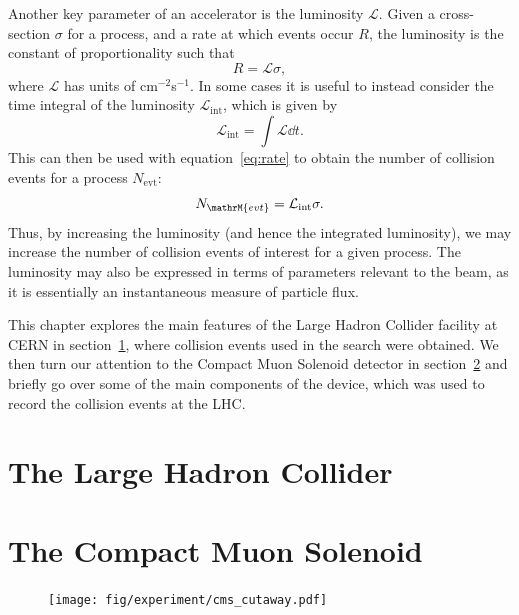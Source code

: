 Another key parameter of an accelerator is the luminosity $\mathcal{L}$.
Given a cross-section $\sigma$ for a process, and a rate at which events occur $R$, the luminosity is the constant of proportionality such that
\begin{equation}\label{eq:rate}
  R=\mathcal{L}\sigma,
\end{equation}
where $\mathcal{L}$ has units of cm$^{-2}$s$^{-1}$. %
In some cases it is useful to instead consider the time integral of the luminosity $\mathcal{L}_\mathrm{int}$, which is given by
\begin{equation}
  \mathcal{L}_\mathrm{int}=\int\mathcal{L}\dd{t}.
\end{equation}
This can then be used with equation~\ref{eq:rate} to obtain the number of collision events for a process $N_\mathrm{evt}$:
\begin{equation}
  N_\mathrM{evt}=\mathcal{L}_\mathrm{int}\sigma.
\end{equation}
Thus, by increasing the luminosity (and hence the integrated luminosity), we may increase the number of collision events of interest for a given process.
The luminosity may also be expressed in terms of parameters relevant to the beam, as it is essentially an instantaneous measure of particle flux. %



This chapter explores the main features of the Large Hadron Collider facility at CERN in section~\ref{sec:LHC}, where collision events used in the search were obtained.
We then turn our attention to the Compact Muon Solenoid detector in section~\ref{sec:CMS} and briefly go over some of the main components of the device, which was used to record the collision events at the LHC.

\section{The Large Hadron Collider} %
\label{sec:LHC}

\section{The Compact Muon Solenoid} %
\label{sec:CMS}

\begin{figure}[htbp] %
  \centering
  \texttt{[image: fig/experiment/cms\_cutaway.pdf]}
  \caption{}
  \label{fig:CMSCut}
\end{figure}

